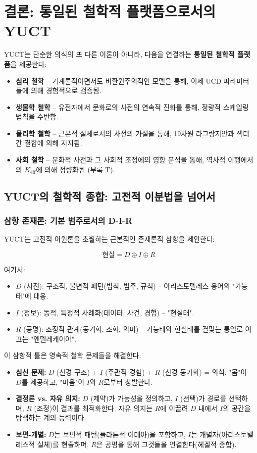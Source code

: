 \documentclass[12pt,a4paper]{article}
\newcommand{\eff}{\mathrm{eff}}
\newcommand{\Ke}{K_{\eff}}
\begin{document}
	\section{결론: 통일된 철학적 플랫폼으로서의 YUCT}
	
	YUCT는 단순한 의식의 또 다른 이론이 아니라, 다음을 연결하는 \textbf{통일된 철학적 플랫폼}을 제공한다:
	\begin{itemize}
		\item \textbf{심리 철학} – 기계론적이면서도 비환원주의적인 모델을 통해, 이제 UCD 파라미터들에 의해 경험적으로 검증됨.
		\item \textbf{생물학 철학} – 유전자에서 문화로의 사전의 연속적 진화를 통해, 정량적 스케일링 법칙을 수반함.
		\item \textbf{물리학 철학} – 근본적 실체로서의 사전의 가설을 통해, 19차원 라그랑지안과 섹터 간 결합에 의해 지지됨.
		\item \textbf{사회 철학} – 문화적 사전과 그 사회적 조정에의 영향 분석을 통해, 역사적 이행에서의 \(\Ke\)에 의해 정량화됨 (부록 T).
	\end{itemize}
	
	\subsection{YUCT의 철학적 종합: 고전적 이분법을 넘어서}
	
	\subsubsection{삼항 존재론: 기본 범주로서의 D-I-R}
	
	YUCT는 고전적 이원론을 초월하는 근본적인 존재론적 삼항을 제안한다:
	
	\[
	\text{현실} = D \oplus I \oplus R
	\]
	
	여기서:
	\begin{itemize}
		\item $D$ (사전): 구조적, 불변적 패턴(법칙, 범주, 규칙) – 아리스토텔레스 용어의 "가능태"에 대응.
		\item $I$ (정보): 동적, 특정적 사례화(데이터, 사건, 경험) – "현실태".
		\item $R$ (공명): 조정적 관계(동기화, 조화, 의미) – 가능태와 현실태를 결맞는 통일로 이끄는 "엔텔레케이아".
	\end{itemize}
	
	이 삼항적 틀은 영속적 철학 문제들을 해결한다:
	
	\begin{itemize}
		\item \textbf{심신 문제:} $D$ (신경 구조) + $I$ (주관적 경험) + $R$ (신경 동기화) = 의식. "몸"이 $D$를 제공하고, "마음"이 $I$와 $R$로부터 창발한다.
		\item \textbf{결정론 vs. 자유 의지:} $D$ (제약)가 가능성을 정의하고, $I$ (선택)가 경로를 선택하며, $R$ (조정)이 결과를 최적화한다. 자유 의지는 $R$에 이끌려 $D$ 내에서 $I$의 공간을 탐색하는 계의 능력이다.
		\item \textbf{보편-개별:} $D$는 보편적 패턴(플라톤적 이데아)을 포함하고, $I$는 개별자(아리스토텔레스적 실체)를 현출하며, $R$은 공명을 통해 그것들을 연결한다(헤겔적 종합).
	\end{itemize}
	
\end{document}
